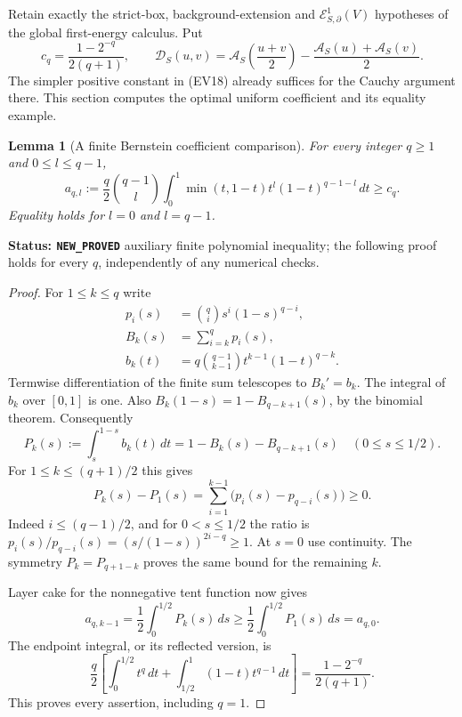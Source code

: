 \documentclass[11pt,a4paper]{article}
\numberwithin{equation}{section}
\newtheorem{lemma}[theorem]{Lemma}
\theoremstyle{definition}
\theoremstyle{remark}
\begin{document}
Retain exactly the strict-box, background-extension and
$\mathcal E^1_{S,\partial}(V)$ hypotheses of the global
first-energy calculus.  Put
\[
 c_q=\frac{1-2^{-q}}{2(q+1)},\qquad
 \mathscr D_S(u,v)=
       \mathscr A_S\left(\frac{u+v}{2}\right)
            -\frac{\mathscr A_S(u)+\mathscr A_S(v)}2 .
 \tag{SM1}
\]
The simpler positive constant in (EV18) already suffices
for the Cauchy argument there.  This section computes
the optimal uniform coefficient and its equality example.

\begin{lemma}[A finite Bernstein coefficient comparison]
\label{lem:r11-midpoint-Bernstein}
For every integer $q\geq1$ and $0\leq l\leq q-1$,
\[
 a_{q,l}:=
 \frac q2\binom{q-1}{l}
    \int_0^1\min(t,1-t)t^l(1-t)^{q-1-l}\,dt
       \geq c_q.
 \tag{SM2}
\]
Equality holds for $l=0$ and $l=q-1$.
\end{lemma}

\noindent\textbf{Status: \texttt{NEW\_PROVED}}
auxiliary finite polynomial inequality; the following
proof holds for every $q$, independently of any numerical
checks.

\begin{proof}
For $1\leq k\leq q$ write
\[
\begin{split}
 p_i(s)&=\binom qi s^i(1-s)^{q-i},\\
 B_k(s)&=\sum_{i=k}^q p_i(s),\\
 b_k(t)&=q\binom{q-1}{k-1}t^{k-1}(1-t)^{q-k}.
\end{split}
 \tag{SM3}
\]
Termwise differentiation of the finite sum telescopes
to $B_k'=b_k$.  The integral of $b_k$ over $[0,1]$
is one.  Also
$B_k(1-s)=1-B_{q-k+1}(s)$, by the binomial theorem.
Consequently
\[
 P_k(s):=\int_s^{1-s}b_k(t)\,dt
              =1-B_k(s)-B_{q-k+1}(s)
                    \quad(0\leq s\leq1/2).
 \tag{SM4}
\]
For $1\leq k\leq(q+1)/2$ this gives
\[
 P_k(s)-P_1(s)
       =\sum_{i=1}^{k-1}\bigl(p_i(s)-p_{q-i}(s)\bigr)\geq0.
 \tag{SM5}
\]
Indeed $i\leq(q-1)/2$, and for $0<s\leq1/2$
the ratio is
$p_i(s)/p_{q-i}(s)=(s/(1-s))^{2i-q}\geq1$.
At $s=0$ use continuity.
The symmetry $P_k=P_{q+1-k}$ proves the same
bound for the remaining $k$.

Layer cake for the nonnegative tent function now gives
\[
 a_{q,k-1}
   =\frac12\int_0^{1/2}P_k(s)\,ds
   \geq\frac12\int_0^{1/2}P_1(s)\,ds=a_{q,0}.
 \tag{SM6}
\]
The endpoint integral, or its reflected version, is
\[
 \frac q2\left[
      \int_0^{1/2}t^q\,dt
        +\int_{1/2}^1(1-t)t^{q-1}\,dt\right]
       =\frac{1-2^{-q}}{2(q+1)}.
 \tag{SM7}
\]
This proves every assertion, including $q=1$.
\end{proof}
\end{document}
